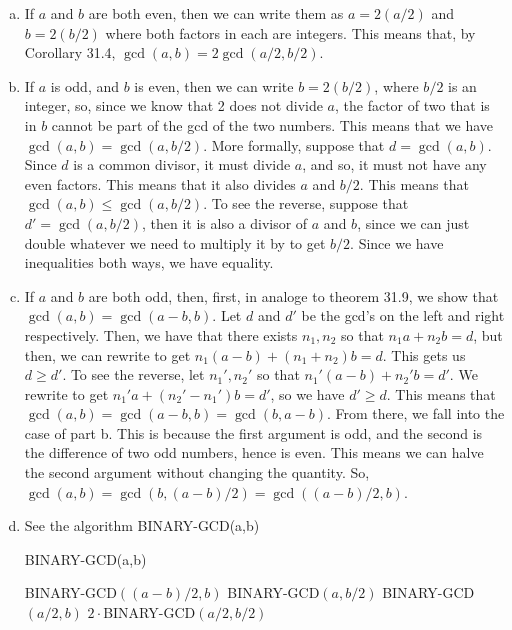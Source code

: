 \documentclass{article}
\begin{document}
\begin{enumerate}[a.]
\item If $a$ and $b$ are both even, then we can write them as $a = 2 (a/2)$ and $b=2(b/2)$ where both factors in each are integers. This means that, by Corollary 31.4, $\gcd(a,b) = 2 \gcd(a/2,b/2)$.
\item If $a$ is odd, and $b$ is even, then we can write $b = 2 (b/2)$, where $b/2$ is an integer, so, since we know that 2 does not divide $a$, the factor of two that is in $b$ cannot be part of the gcd of the two numbers. This means that we have $\gcd(a,b) = \gcd(a,b/2)$. More formally, suppose that $d= \gcd(a,b)$. Since $d$ is a common divisor, it must divide $a$, and so, it must not have any even factors. This means that it also divides $a$ and $b/2$. This means that $\gcd(a,b) \le \gcd(a,b/2)$. To see the reverse, suppose that $d' = \gcd(a,b/2)$, then it is also a divisor of $a$ and $b$, since we can just double whatever we need to multiply it by to get $b/2$. Since we have inequalities both ways, we have equality.
\item
If $a$ and $b$ are both odd, then, first, in analoge to theorem 31.9, we show that $\gcd(a,b) = \gcd(a-b,b)$. Let $d$ and $d'$ be the gcd's on the left and right respectively. Then, we have that there exists $n_1,n_2$ so that $n_1 a + n_2 b = d$, but then, we can rewrite to get $n_1( a- b) + (n_1+n_2)b = d$. This gets us $d \ge d'$. To see the reverse, let $n_1',n_2'$ so that $n_1' (a-b) + n_2' b = d'$. We rewrite to get $n_1' a + (n_2' - n_1') b = d'$, so we have $d'\ge d$. This means that $\gcd(a,b) = \gcd(a-b,b) = \gcd(b,a-b)$. From there, we fall into the case of part b. This is because the first argument is odd, and the second is the difference of two odd numbers, hence is even. This means we can halve the second argument without changing the quantity. So, $\gcd(a,b) = \gcd(b, (a-b)/2) =\gcd((a-b)/2,b)$.
\item
See the algorithm BINARY-GCD(a,b)

\begin{algorithm}
\caption{BINARY-GCD(a,b)}
\begin{algorithmic}
\State \Return BINARY-GCD$((a-b)/2,b)$
\Else
\State \Return BINARY-GCD$(a,b/2)$
\EndIf
\Else
{}
\State \Return BINARY-GCD$(a/2,b)$
\Else
\State \Return $2\cdot $BINARY-GCD$(a/2,b/2)$
\EndIf
\EndIf
\end{algorithmic}
\end{algorithm}
\end{enumerate}
\end{document}

